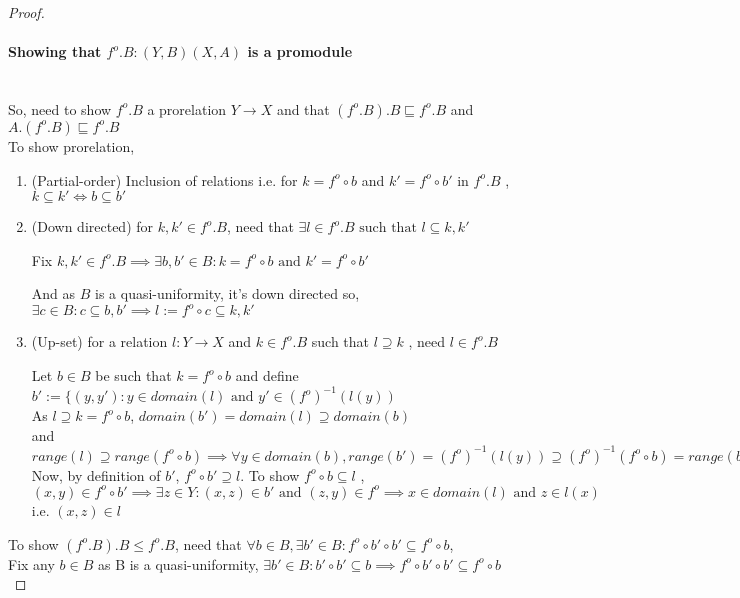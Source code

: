 \documentclass[18pt,a4paper]{article}
\makeatletter
\theoremstyle{definition}
\newcommand{\carrow}{}%
\DeclareRobustCommand{\carrow}{%
	\mathrel{\vphantom{\rightarrow}\mathpalette\circle@arrow\relax}%
}
\newcommand{\circle@arrow}[2]{%
	\m@th
	\ooalign{%
		\hidewidth$#1\circ\mkern1mu$\hidewidth\cr
	$#1\longrightarrow$\cr}%
}
\makeatother
\begin{document}
	\begin{proof}
	\item \paragraph{Showing that $f^o .B: (Y,B) \carrow (X,A)$ is a promodule } \mbox{} \\
		So, need to show $f^o .B$ a prorelation $Y \to X$
		and that $(f^o .B).B \sqsubseteq f^o .B$ and $A.(f^o .B) \sqsubseteq f^o .B$ \\
		To show prorelation, \begin{enumerate}[label=(\roman*)]
			\item (Partial-order) Inclusion of relations i.e. for $k=f^o \circ b$ and
				$k'=f^o \circ b'$ in $f^o .B$ , $k \subseteq k' \iff b \subseteq b'$
			\item (Down directed) for $k,k' \in f^o .B$, need that $\exists l \in f^o .B
				\text{ such that } l \subseteq k,k'$

				Fix $k,k' \in f^o .B \implies \exists b,b' \in B : k=f^o \circ b \text{ and }
				k' = f^o \circ b'$

				And as $B$ is a quasi-uniformity, it's down directed so,
				$\exists c \in B: c \subseteq b,b' \implies l:= f^o \circ c \subseteq k,k'$
			\item (Up-set) for a relation $l:Y \to X$ and $k \in f^o .B$ such that $l \supseteq k$
				, need $l \in f^o .B$

				Let $b\in B$ be such that $k=f^o \circ b$ and define
				$b':=\{(y,y'): y \in domain(l) \text{ and } y' \in (f^o)^{-1}(l(y))$\\
					As $l\supseteq k=f^o \circ b$, $domain(b')=domain(l)\supseteq domain(b)$
					\\ and $range(l) \supseteq range(f^o \circ b)\implies
					\forall y \in domain(b), range (b')=(f^o )^{-1}(l(y)) \supseteq (f^o)^{-1}(f^o \circ b ) = range(b)$\\
					Now, by definition of $b'$, $f^o \circ b' \supseteq l$. To show
					$f^o \circ b \subseteq l$ , \\
					$(x,y)\in f^o \circ b' \implies \exists z \in Y: (x,z)\in b' \text{ and }
					(z,y) \in f^o \implies x \in domain(l) \text{ and } z \in l(x)$ i.e.
					$(x,z) \in l$

			\end{enumerate}
		\item	To show $(f^o .B).B \leq f^o .B$, need that $\forall b \in B,
			\exists b' \in B : f^o \circ b' \circ b' \subseteq f^o \circ b$,\\
			Fix any $b \in B$ as B is a quasi-uniformity, $\exists b' \in B : b' \circ b' \subseteq b
			\implies f^o \circ b'\circ b' \subseteq f^o \circ b$


\end{proof}
\end{document}
